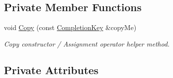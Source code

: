 \subsection*{Private Member Functions}
\begin{DoxyCompactItemize}
\item 
void \hyperlink{class_completion_key_a0aca2c8d539bd05b7261626634a57dba}{Copy} (const \hyperlink{class_completion_key}{CompletionKey} \&copyMe)
\begin{DoxyCompactList}\small\item\em Copy constructor / Assignment operator helper method. \item\end{DoxyCompactList}\end{DoxyCompactItemize}
\subsection*{Private Attributes}
